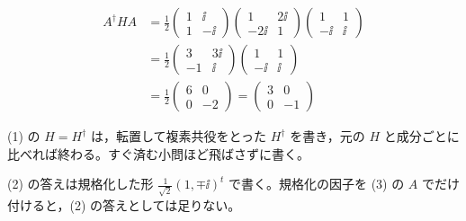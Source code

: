 \begin{align*}
  A^{\dagger}HA&=\frac{1}{2}\begin{pmatrix}1&\ii\\1&-\ii\end{pmatrix}\begin{pmatrix}1&2\ii\\-2\ii&1\end{pmatrix}\begin{pmatrix}1&1\\-\ii&\ii\end{pmatrix}\\
  &=\frac{1}{2}\begin{pmatrix}3&3\ii\\-1&\ii\end{pmatrix}\begin{pmatrix}1&1\\-\ii&\ii\end{pmatrix}\\
  &=\frac{1}{2}\begin{pmatrix}6&0\\0&-2\end{pmatrix}=\begin{pmatrix}3&0\\0&-1\end{pmatrix}
\end{align*}
\item (1) の $H=H^{\dagger}$ は，転置して複素共役をとった $H^{\dagger}$ を書き，元の $H$ と成分ごとに比べれば終わる。すぐ済む小問ほど飛ばさずに書く。
\item (2) の答えは規格化した形 $\frac{1}{\sqrt{2}}(1,\mp\ii)^{t}$ で書く。規格化の因子を (3) の $A$ でだけ付けると，(2) の答えとしては足りない。
